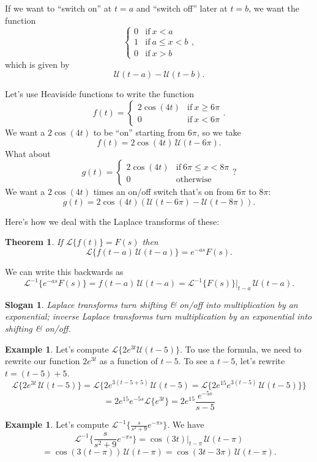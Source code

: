 \documentclass[12pt]{amsart}
\numberwithin{equation}{section}
\theoremstyle{plain} %
\newtheorem{thm}[equation]{Theorem}
\newtheorem{slogan}[equation]{Slogan}
\theoremstyle{definition}
\newtheorem{ex}[equation]{Example}
\theoremstyle{remark}
\newcommand{\LA}[1]{\mathcal{L}\{ #1 \}}
\newcommand{\LAi}[1]{\mathcal{L}^{-1}\{ #1 \}}
\newcommand{\U}{\mathcal{U}}
\begin{document}
If we want to ``switch on'' at $t=a$ and ``switch off'' later at $t=b$, we want the function
\[ \begin{cases} 0 &\text{if} \ x < a \\ 
1 &\text{if} \ a \leq x < b \\
0 &\text{if} \ x>b \end{cases},\]
which is given by
\[ \U(t-a) - \U(t-b).\]

Let's use Heaviside functions to write the function
\[ f(t) = \begin{cases} 2 \cos(4t) &\text{if} \ x \geq 6\pi \\
0 &\text{if} \ x < 6\pi \end{cases}.\]
We want a $2 \cos(4t)$ to be ``on'' starting from $6\pi$, so we take
\[ f(t) = 2 \cos(4t)\, \U(t-6\pi).\]
What about 
\[ g(t) = \begin{cases} 2 \cos(4t) &\text{if} \ 6 \pi \leq x < 8\pi \\
0 &\text{otherwise} \end{cases}?\]
We want a $2 \cos(4t)$ times an on/off switch that's on from $6 \pi$ to  $8\pi$:
\[ g(t) = 2 \cos(4t) ( \U(t-6 \pi) - \U(t-8 \pi) ).\]

Here's how we deal with the Laplace transforms of these:

\begin{thm} If $\LA{f(t)} = F(s)$ then
\[ \LA{f(t-a)\, \U(t-a)} = e^{-as} F(s).\]
\end{thm}

We can write this backwards as 
\[ \LAi{e^{-as} F(s)} = f(t-a)\, \U(t-a) =\LAi{F(s)}|_{t-a}\, \U(t-a).\]

\begin{slogan}
Laplace transforms turn shifting \& on/off into multiplication by an exponential; inverse Laplace transforms turn multiplication by an exponential into shifting \& on/off.
\end{slogan}

\begin{ex} Let's compute $\LA{ 2 e^{3t} \U(t-5)}$.
To use the formula, we need to rewrite our function $2 e^{3t}$ as a function of $t-5$. To see a $t-5$, let's rewrite $t=(t-5)+5$.
\[ \LA{ 2 e^{3t}\, \U(t-5)} = \LA{ 2 e^{3(t-5 + 5)}\, \U(t-5)= \LA{ 2 e^{15} e^{3(t-5)}\, \U(t-5)}} \]
\[= 2 e^{15} e^{-5s} \LA{e^{3t}} = 2 e^{15} \frac{e^{-5s}}{s-5}\]
\end{ex}

\begin{ex} Let's compute $\displaystyle\LAi{ \frac{s}{s^2+9} e^{-\pi s}}$.
We have
\[ \LAi{ \frac{s}{s^2+9} e^{-\pi s}} = \cos(3t)|_{t-\pi}\, \U(t-\pi) \] \[= \cos(3(t-\pi))\, \U(t-\pi) = \cos(3t-3\pi)\, \U(t-\pi).\]
\end{ex}
\end{document}
